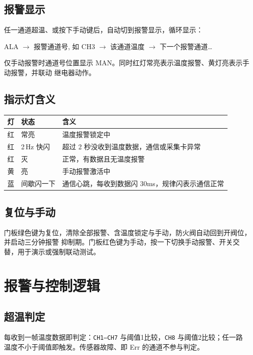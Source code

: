 \documentclass[a4paper,11pt]{ctexart}
\begin{document}
\subsection{报警显示}
任一通道超温、或按下手动键后，自动切到报警显示，循环显示：
\begin{center}\ttfamily
ALA $\to$ 报警通道号, 如 CH3 $\to$ 该通道温度 $\to$ 下一个报警通道\dots
\end{center}
仅手动报警时通道号位置显示 MAN。同时红灯常亮表示温度报警、黄灯亮表示手动报警，并联动
继电器动作。

\subsection{指示灯含义}
\renewcommand{\arraystretch}{1.3}
\begin{center}
\begin{tabular}{|l|l|L{7.2cm}|}
\hline
灯 & 状态 & 含义\\
\hline
红 & 常亮 & 温度报警锁定中\\
\hline
红 & 2\,Hz 快闪 & 超过 2 秒没收到温度数据，通信或采集卡异常\\
\hline
红 & 灭 & 正常，有数据且无温度报警\\
\hline
黄 & 亮 & 手动报警激活中\\
\hline
蓝 & 间歇闪一下 & 通信心跳，每收到数据闪 30ms，规律闪表示通信正常\\
\hline
\end{tabular}
\end{center}
\renewcommand{\arraystretch}{1.0}

\subsection{复位与手动}
门板绿色键为复位，清除全部报警、含温度锁定与手动，防火阀自动回到开阀位，并启动三分钟报警
抑制期。门板红色键为手动，按一下切换手动报警、开关交替，用于演示或强制联动测试。

\section{报警与控制逻辑}
\subsection{超温判定}
每收到一帧温度数据即判定：\texttt{CH1--CH7} 与阈值1比较，\texttt{CH8} 与阈值2比较；任一路
温度不小于阈值即触发。传感器故障、即 Err 的通道不参与判定。
\end{document}
